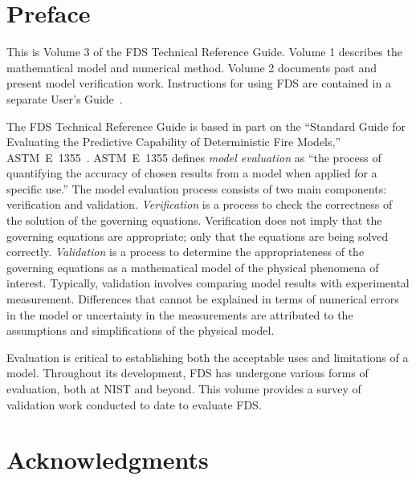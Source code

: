\documentclass[11pt]{book}
\begin{document}



\chapter{Preface}

This is Volume 3 of the FDS Technical Reference Guide. Volume 1 describes the mathematical model and numerical method. Volume 2 documents past and
present model verification work. Instructions for using FDS are contained in a separate User's Guide~\cite{FDS_Users_Guide}.

The FDS Technical Reference Guide is based in part on the ``Standard Guide for Evaluating the Predictive Capability of
Deterministic Fire Models,'' ASTM~E~1355~\cite{ASTM:E1355}. ASTM~E~1355 defines {\em model evaluation} as ``the process of quantifying the accuracy
of chosen results from a model when applied for a specific use.'' The model evaluation process consists of two main components: verification and
validation. {\em Verification} is a process to check the correctness of the solution of the governing equations. Verification does not imply that the
governing equations are appropriate; only that the equations are being solved correctly. {\em Validation} is a process to determine the
appropriateness of the governing equations as a mathematical model of the physical phenomena of interest. Typically, validation involves comparing
model results with experimental measurement. Differences that cannot be explained in terms of numerical errors in the model or uncertainty in the
measurements are attributed to the assumptions and simplifications of the physical model.

Evaluation is critical to establishing both the acceptable uses and limitations of a model. Throughout its development, FDS has undergone various
forms of evaluation, both at NIST and beyond. This volume provides a survey of validation work conducted to date to evaluate FDS.





\chapter{Acknowledgments}
\label{acksection}
\end{document}
